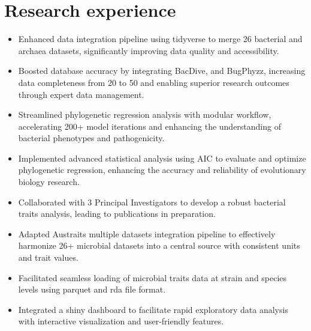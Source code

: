 \documentclass[12pt,a4paper,sans]{moderncv} %
\begin{document}
\section{Research experience}

{
}
{
    \begin{itemize} 
        \item Enhanced data integration pipeline using tidyverse to merge 26 bacterial and archaea datasets, significantly improving data quality and accessibility. 
        \item Boosted database accuracy by integrating BacDive, and BugPhyzz, increasing data completeness from 20 to 50 and enabling superior research outcomes through expert data management. 
        \item Streamlined phylogenetic regression analysis with modular workflow, accelerating 200+ model iterations and enhancing the understanding of bacterial phenotypes and pathogenicity.
        \item Implemented advanced statistical analysis using AIC to evaluate and optimize phylogenetic regression, enhancing the accuracy and reliability of evolutionary biology research.
        \item Collaborated with 3 Principal Investigators to develop a robust bacterial traits analysis, leading to publications in preparation.
    \end{itemize}
}
{
    \begin{itemize} 
            \item Adapted Austraits multiple datasets integration pipeline to effectively harmonize 26+ microbial datasets into a central source with consistent units and trait values. 
            \item Facilitated seamless loading of microbial traits data at strain and species levels using parquet and rda file format.
            \item Integrated a shiny dashboard to facilitate rapid exploratory data analysis with interactive visualization and user-friendly features.
    \end{itemize}
}
\end{document}
